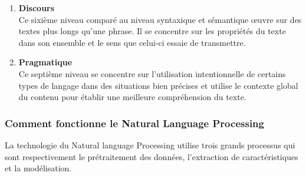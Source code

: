 \documentclass{rapport}
\begin{document}
\begin{enumerate}[listparindent=0pt, parsep=0pt]
    \item \textbf{Discours}\\
    Ce sixième niveau comparé au niveau syntaxique et sémantique œuvre sur des textes plus longs qu'une phrase. Il se concentre sur les propriétés du texte dans son ensemble et le sens que celui-ci essaie de transmettre.\\
    
    \item \textbf{Pragmatique}\\
    Ce septième niveau se concentre sur l'utilisation intentionnelle de certains types de langage dans des situations bien précises et utilise le contexte global du contenu pour établir une meilleure compréhension du texte.\\

\end{enumerate}
    
\newpage

\subsubsection{Comment fonctionne le Natural Language Processing}
\label{subsub:NLP_work}
La technologie du Natural language Processing utilise trois grands processus qui sont respectivement le prétraitement des données, l'extraction de caractéristiques et la modélisation.\\
\end{document}
